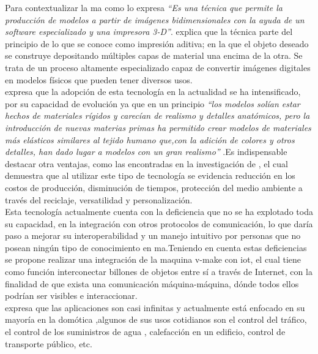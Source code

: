 Para contextualizar la \acrshort{ma} como lo expresa \cite{heinze} \textit{“Es una técnica que permite la producción de modelos a partir de imágenes bidimensionales con la ayuda de un software   especializado   y   una   impresora   3-D”}. \citep{blaquez}  explica que la técnica parte del principio de lo que se conoce como impresión aditiva; en la que el objeto deseado se construye depositando múltiples capas de material una encima de la otra. Se trata de un proceso altamente especializado capaz de convertir imágenes digitales en modelos físicos que pueden tener diversos usos. \\

\citep{chen} expresa que la adopción de esta tecnología en la actualidad se ha intensificado, por su capacidad de evolución ya que en un principio \textit{“los modelos solían estar hechos de materiales rígidos y carecían de realismo y detalles anatómicos, pero la introducción de nuevas materias primas ha permitido crear modelos de materiales más elásticos similares al tejido humano que,con la adición de colores y otros detalles, han dado lugar a modelos con un gran realismo”} .Es indispensable destacar otra ventajas, como las encontradas en la investigación de \citep{reyes}, el cual demuestra que al utilizar este tipo de tecnología se evidencia reducción en los costos de producción, disminución de tiempos, protección del medio ambiente a través del reciclaje, versatilidad y personalización. \\


Esta tecnología actualmente cuenta con la deficiencia que no se ha explotado toda su capacidad, en la integración con otros protocolos de comunicación, lo que daría paso a mejorar su interoperabilidad y un manejo intuitivo por personas que no posean ningún tipo de conocimiento en \acrshort{ma}.Teniendo en cuenta estas deficiencias se propone realizar una integración de la maquina v-make con \acrshort{iot}, el cual tiene como función interconectar billones de objetos entre sí a través de Internet, con la finalidad de que exista una comunicación máquina-máquina, dónde todos ellos podrían ser visibles e interaccionar.\\

\citep{cristian} expresa que las aplicaciones son casi infinitas y actualmente está enfocado en su mayoría en la domótica ,algunos de sus usos cotidianos son el control del tráfico, el control de los suministros de agua , calefacción en un edificio,  control de transporte público, etc.\\

